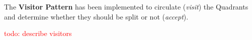 \documentclass[10pt]{article}
\begin{document}
The \textbf{Visitor Pattern} has been implemented to circulate (\textit{visit}) the Quadrants and determine whether they should be split or not (\textit{accept}).

\textcolor{red}{todo: describe visitors}

%
\begin{figure}[htb]
\centering
\centering
\centering
\centering
\centering
\end{figure}
\end{document}

